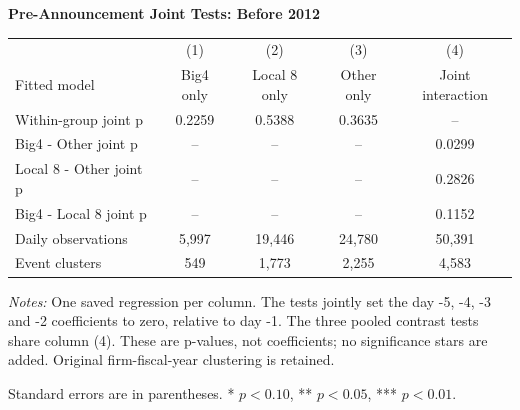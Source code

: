 \documentclass[10pt]{article}
\begin{document}
\begin{minipage}{18.40cm}
\fontsize{10}{12}\selectfont
\setlength{\tabcolsep}{4pt}\renewcommand{\arraystretch}{1.08}
{\large\bfseries Pre-Announcement Joint Tests: Before 2012}\par\medskip
\begin{tabular*}{\linewidth}{@{\extracolsep{\fill}}lcccc@{}}
\toprule
 & (1) & (2) & (3) & (4) \\
Fitted model & Big4 only & Local 8 only & Other only & Joint interaction \\
\midrule
Within-group joint p & 0.2259 & 0.5388 & 0.3635 & -- \\
Big4 - Other joint p & -- & -- & -- & 0.0299 \\
Local 8 - Other joint p & -- & -- & -- & 0.2826 \\
Big4 - Local 8 joint p & -- & -- & -- & 0.1152 \\
\midrule
Daily observations & 5,997 & 19,446 & 24,780 & 50,391 \\
Event clusters & 549 & 1,773 & 2,255 & 4,583 \\
\bottomrule\end{tabular*}\par\medskip
\fontsize{9}{11}\selectfont\textit{Notes:} One saved regression per column. The tests jointly set the day -5, -4, -3 and -2 coefficients to zero, relative to day -1. The three pooled contrast tests share column (4). These are p-values, not coefficients; no significance stars are added. Original firm-fiscal-year clustering is retained.
\par Standard errors are in parentheses. * $p<0.10$, ** $p<0.05$, *** $p<0.01$.
\end{minipage}
\end{document}

